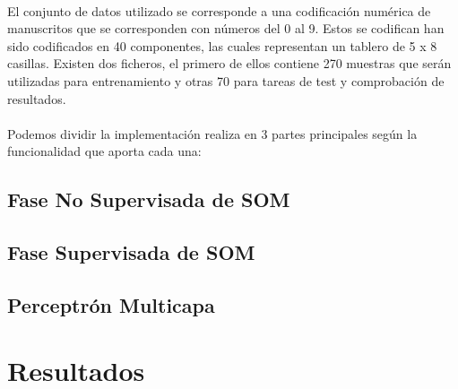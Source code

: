 \documentclass[10pt, a4paper,spanish]{article}
\begin{document}
		\paragraph{}
		El conjunto de datos utilizado se corresponde a una codificación numérica de manuscritos que se corresponden con números del 0 al 9. Estos se codifican han sido codificados en 40 componentes, las cuales representan un tablero de 5 x 8 casillas. Existen dos ficheros, el primero de ellos contiene 270 muestras que serán utilizadas para entrenamiento y otras 70 para tareas de test y comprobación de resultados.

		\paragraph{}
		Podemos dividir la implementación realiza en 3 partes principales según la funcionalidad que aporta cada una:


		\subsection{Fase No Supervisada de SOM}

			\paragraph{}


		\subsection{Fase Supervisada de SOM}

			\paragraph{}

		\subsection{Perceptrón Multicapa}

			\paragraph{}


	\section{Resultados}

		\paragraph{}
\end{document}
